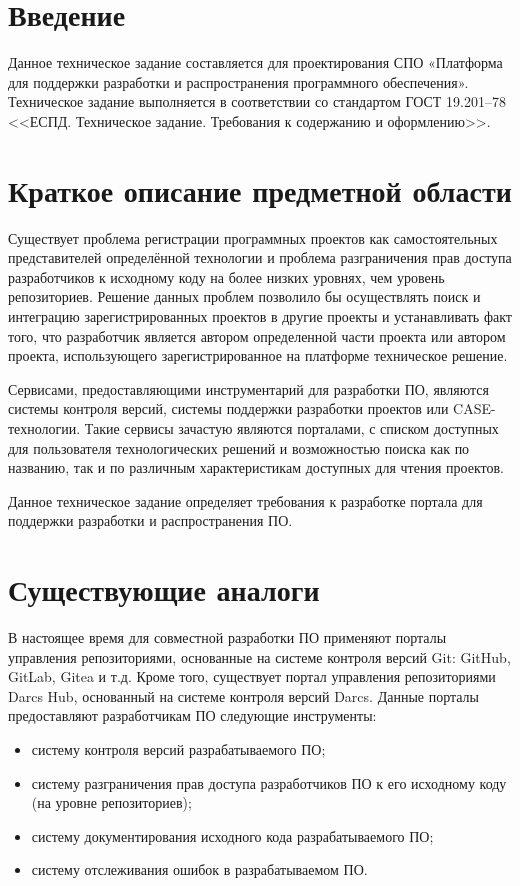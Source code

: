 \documentclass{bmstu}
\begin{document}
  \section*{Введение}

  Данное техническое задание составляется для проектирования СПО
  «Платформа для поддержки разработки и распространения программного
  обеспечения».
  Техническое задание выполняется в соответствии со стандартом ГОСТ
  19.201–78 <<ЕСПД. Техническое задание. Требования к содержанию и
  оформлению>>.

  \section{Краткое описание предметной области}

  Существует проблема регистрации программных проектов как
  самостоятельных представителей определённой технологии и проблема
  разграничения прав доступа разработчиков к исходному коду на более
  низких уровнях, чем уровень репозиториев.
  Решение данных проблем позволило бы осуществлять поиск и интеграцию
  зарегистрированных проектов в другие проекты и устанавливать факт
  того, что разработчик является автором определенной части проекта
  или автором проекта, использующего зарегистрированное на платформе
  техническое решение.

  Сервисами, предоставляющими инструментарий для разработки ПО,
  являются системы контроля версий, системы поддержки разработки
  проектов или CASE-технологии.
  Такие сервисы зачастую являются порталами, с списком доступных для
  пользователя технологических решений и возможностью поиска как по
  названию, так и по различным характеристикам доступных для чтения
  проектов.

  Данное техническое задание определяет требования к разработке
  портала для поддержки разработки и распространения ПО.

  \section{Существующие аналоги}

  В настоящее время для совместной разработки ПО применяют порталы
  управления репозиториями, основанные на системе контроля версий Git:
  GitHub, GitLab, Gitea и т.д.
  Кроме того, существует портал управления репозиториями Darcs Hub,
  основанный на системе контроля версий Darcs.
  Данные порталы предоставляют разработчикам ПО следующие инструменты:
  \begin{itemize}[label=---]
    \item систему контроля версий разрабатываемого ПО;
    \item систему разграничения прав доступа разработчиков ПО к его
      исходному коду (на уровне репозиториев);
    \item систему документирования исходного кода разрабатываемого ПО;
    \item систему отслеживания ошибок в разрабатываемом ПО.
  \end{itemize}
\end{document}
